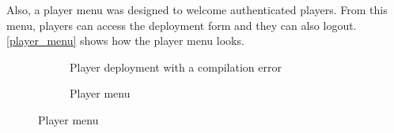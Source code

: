\documentclass[a4paper,11pt,titlepage,abstract,numbers=noenddot,automark,mnsy,intlimits,rgb,dvipsnames]{report}
\begin{document}
Also, a player menu was designed to welcome authenticated players. From this menu, players can access the deployment form
and they can also logout. \autoref{player_menu} shows how the player menu looks.
\begin{figure}[H]
\begin{minipage}{.5\textwidth}
\begin{figure}[H]
\caption{Player deployment with a compilation error}
\label{deploy_error}
\end{figure}
\end{minipage}
\begin{minipage}{.5\textwidth}
\begin{figure}[H]
\caption{Player menu}
\label{player_menu}
\end{figure}
\end{minipage}
\end{figure}
\end{document}
